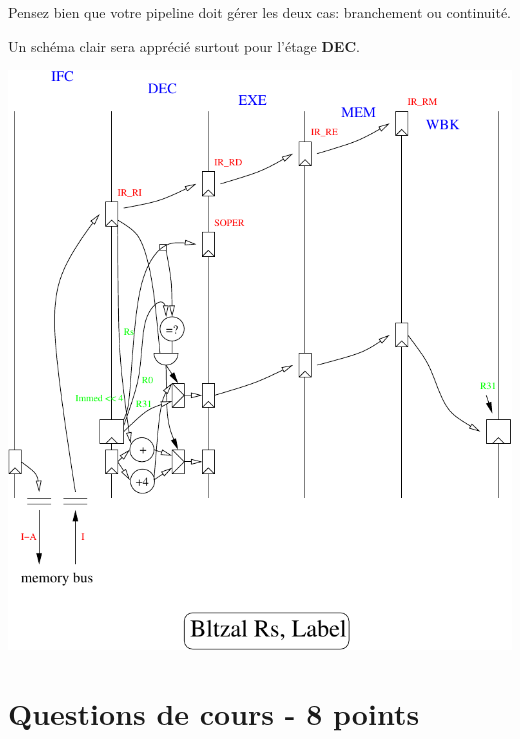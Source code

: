 Pensez bien que votre pipeline doit g\'erer les deux cas: branchement
ou continuit\'e.

Un sch\'ema clair sera appr\'eci\'e surtout pour l'\'etage \textbf{DEC}.

\begin{correction}

  \begin{center}
    \includegraphics[scale=0.8]{figures/correction-vue-detaillee.pdf}
  \end{center}

\end{correction}

%
%

\section{Questions de cours - 8 points}

